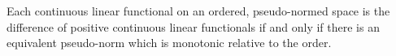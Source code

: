 Each continuous linear functional on an ordered, pseudo-normed space is the difference of positive continuous linear functionals if and only if there is an equivalent pseudo-norm which is monotonic relative to the order.
